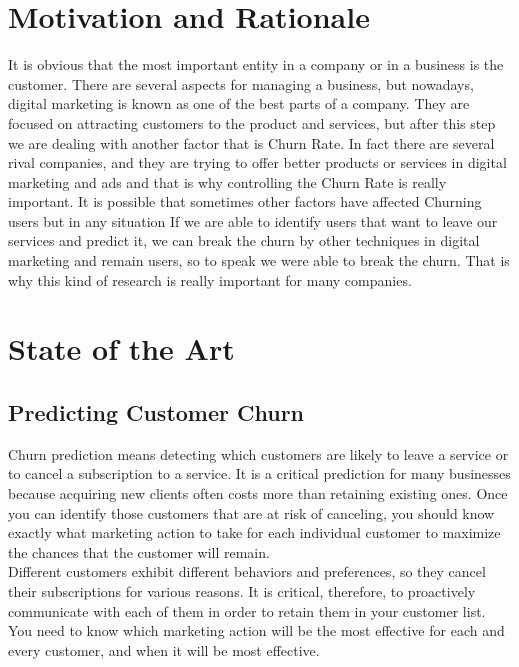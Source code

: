 \documentclass[12pt]{article}
\begin{document}
\section{Motivation and Rationale}
It is obvious that the most important entity in a company or in a business is the customer. There are several aspects for managing a business, but nowadays, digital marketing is known as one of the best parts of a company.
They are focused on attracting customers to the product and services, but after this step we are dealing with another factor that is Churn Rate.
In fact there are several rival companies, and they are trying to offer better products or services in digital marketing and ads and that is why controlling the Churn Rate is really important.
It is possible that sometimes other factors have affected Churning users but in any situation If we are able to identify users that want to leave our services and predict it, we can break the churn by other techniques in digital marketing and remain users, so to speak we were able to break the churn. 
That is why this kind of research is really important for many companies.

\section{State of the Art}

\subsection{Predicting Customer Churn}
Churn prediction means detecting which customers are likely to leave a service or to cancel a subscription to a service. It is a critical prediction for many businesses because acquiring new clients often costs more than retaining existing ones. Once you can identify those customers that are at risk of canceling, you should know exactly what marketing action to take for each individual customer to maximize the chances that the customer will remain.\\
Different customers exhibit different behaviors and preferences, so they cancel their subscriptions for various reasons. It is critical, therefore, to proactively communicate with each of them in order to retain them in your customer list. You need to know which marketing action will be the most effective for each and every customer, and when it will be most effective.
\end{document}
